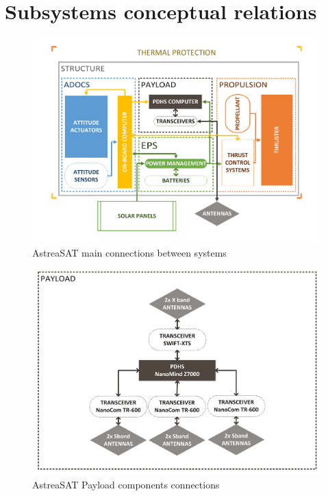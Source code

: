 \section{Subsystems conceptual relations}
\begin{landscape}
	\begin{figure}[h]
		\centering
		\includegraphics[scale=0.8]{./sections/SatelliteConfiguration/ESQUEMA_ASTREASAT}
		\caption{AstreaSAT main connections between systems}
	\end{figure}
	\begin{figure}[h]
		\centering
		\includegraphics[scale=0.8]{./sections/SatelliteConfiguration/Payload_detail}
		\caption{AstreaSAT Payload components connections}
	\end{figure}
\end{landscape}
\clearpage
%
%